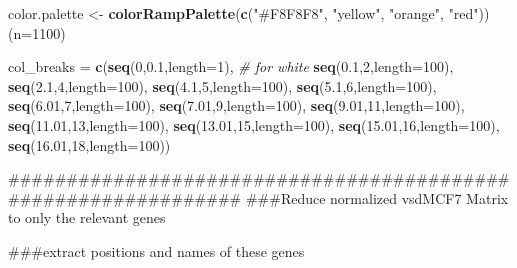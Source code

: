 \documentclass[]{article}
\newenvironment{Shaded}{\begin{snugshade}}{\end{snugshade}}
\newcommand{\KeywordTok}[1]{\textcolor[rgb]{0.13,0.29,0.53}{\textbf{#1}}}
\newcommand{\DataTypeTok}[1]{\textcolor[rgb]{0.13,0.29,0.53}{#1}}
\newcommand{\DecValTok}[1]{\textcolor[rgb]{0.00,0.00,0.81}{#1}}
\newcommand{\FloatTok}[1]{\textcolor[rgb]{0.00,0.00,0.81}{#1}}
\newcommand{\StringTok}[1]{\textcolor[rgb]{0.31,0.60,0.02}{#1}}
\newcommand{\CommentTok}[1]{\textcolor[rgb]{0.56,0.35,0.01}{\textit{#1}}}
\newcommand{\NormalTok}[1]{#1}
\begin{document}
\begin{Shaded}
\begin{Highlighting}[]
\NormalTok{color.palette <-}\StringTok{ }\KeywordTok{colorRampPalette}\NormalTok{(}\KeywordTok{c}\NormalTok{(}\StringTok{"#F8F8F8"}\NormalTok{, }\StringTok{"yellow"}\NormalTok{, }\StringTok{"orange"}\NormalTok{, }\StringTok{"red"}\NormalTok{))(}\DataTypeTok{n=}\DecValTok{1100}\NormalTok{)}

\NormalTok{col_breaks =}\StringTok{ }\KeywordTok{c}\NormalTok{(}\KeywordTok{seq}\NormalTok{(}\DecValTok{0}\NormalTok{,}\FloatTok{0.1}\NormalTok{,}\DataTypeTok{length=}\DecValTok{1}\NormalTok{),  }\CommentTok{# for white}
                \KeywordTok{seq}\NormalTok{(}\FloatTok{0.1}\NormalTok{,}\DecValTok{2}\NormalTok{,}\DataTypeTok{length=}\DecValTok{100}\NormalTok{),}
                \KeywordTok{seq}\NormalTok{(}\FloatTok{2.1}\NormalTok{,}\DecValTok{4}\NormalTok{,}\DataTypeTok{length=}\DecValTok{100}\NormalTok{),}
                \KeywordTok{seq}\NormalTok{(}\FloatTok{4.1}\NormalTok{,}\DecValTok{5}\NormalTok{,}\DataTypeTok{length=}\DecValTok{100}\NormalTok{),}
                \KeywordTok{seq}\NormalTok{(}\FloatTok{5.1}\NormalTok{,}\DecValTok{6}\NormalTok{,}\DataTypeTok{length=}\DecValTok{100}\NormalTok{),}
                \KeywordTok{seq}\NormalTok{(}\FloatTok{6.01}\NormalTok{,}\DecValTok{7}\NormalTok{,}\DataTypeTok{length=}\DecValTok{100}\NormalTok{),}
                \KeywordTok{seq}\NormalTok{(}\FloatTok{7.01}\NormalTok{,}\DecValTok{9}\NormalTok{,}\DataTypeTok{length=}\DecValTok{100}\NormalTok{),}
                \KeywordTok{seq}\NormalTok{(}\FloatTok{9.01}\NormalTok{,}\DecValTok{11}\NormalTok{,}\DataTypeTok{length=}\DecValTok{100}\NormalTok{),}
                \KeywordTok{seq}\NormalTok{(}\FloatTok{11.01}\NormalTok{,}\DecValTok{13}\NormalTok{,}\DataTypeTok{length=}\DecValTok{100}\NormalTok{),}
                \KeywordTok{seq}\NormalTok{(}\FloatTok{13.01}\NormalTok{,}\DecValTok{15}\NormalTok{,}\DataTypeTok{length=}\DecValTok{100}\NormalTok{),}
                \KeywordTok{seq}\NormalTok{(}\FloatTok{15.01}\NormalTok{,}\DecValTok{16}\NormalTok{,}\DataTypeTok{length=}\DecValTok{100}\NormalTok{),}
                \KeywordTok{seq}\NormalTok{(}\FloatTok{16.01}\NormalTok{,}\DecValTok{18}\NormalTok{,}\DataTypeTok{length=}\DecValTok{100}\NormalTok{))}

\NormalTok{###############################################################}
\NormalTok{###Reduce normalized vsdMCF7 Matrix to only the relevant genes}

\NormalTok{###extract positions and names of these genes}


\end{Highlighting}
\end{Shaded}
\end{document}
